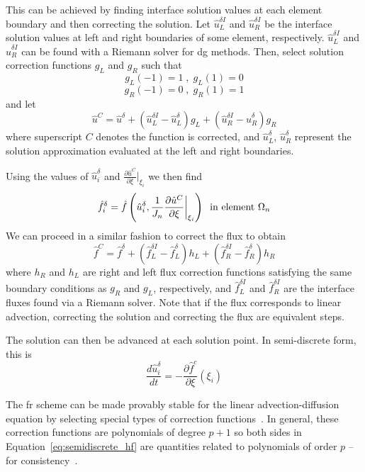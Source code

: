 This can be achieved by finding interface solution values at each element boundary and then correcting the 
solution. Let $\hat{u}_L^{\delta I}$ and $\hat{u}_R^{\delta I}$ be the interface solution values at left and right 
boundaries of some element, respectively. $\hat{u}_L^{\delta I}$ and $\hat{u}_R^{\delta I}$ can be found with a Riemann solver for \gls{dg} methods\cite{hesthaven2007nodal}. Then, select solution correction functions $g_L$ and 
$g_R$ such 
that
\begin{equation}\label{eq:condition_hf}
g_L(-1) = 1 \;,\; g_L(1) = 0
\end{equation}
\begin{equation}
g_R(-1) = 0 \;,\; g_R(1) = 1
\end{equation}
and let
\begin{equation}
\hat{u}^C = \hat{u}^\delta + (\hat{u}^{\delta I}_L - \hat{u}^\delta_L) g_L + (\hat{u}^{\delta I}_R 
- \hat{u}^\delta_R) g_R
\end{equation}
where superscript $C$ denotes the function is corrected, and $\hat{u}^\delta_L$, $\hat{u}^\delta_R$ 
represent the solution approximation evaluated at the left and right boundaries.

Using the values of $\hat{u}^\delta_i$ and $\frac{\partial \hat{u}^C}{\partial \xi}|_{\xi_i}$ we then find 
$$\hat{f}_i^\delta = \hat{f}\left(\hat{u}^\delta_i,\frac{1}{J_n}\frac{\partial \hat{u}^C}{\partial \xi}\bigg|_{\xi_i}\right) \;\; \text{in element } \Omega_n$$
We can proceed in a similar fashion to correct the flux to obtain
\begin{equation}
\hat{f}^C = \hat{f}^\delta + (\hat{f}^{\delta I}_L - \hat{f}^\delta_L) h_L + (\hat{f}^{\delta I}_R 
- \hat{f}^\delta_R) h_R
\end{equation}
where $h_R$ and $h_L$ are right and left flux correction functions satisfying the same boundary 
conditions as $g_R$ and $g_L$, respectively, and $\hat{f}_L^{\delta I}$ and $\hat{f}_R^{\delta I}$ are the interface fluxes found via a Riemann solver. Note that if the flux corresponds to linear advection, correcting the solution and correcting the flux are equivalent steps.

The solution can then be advanced at each solution point. In semi-discrete form, this is
\begin{equation}\label{eq:semidiscrete_hf}
\frac{d \hat{u}_i^\delta}{d t} = - \frac{\partial \hat{f}^c}{\partial \xi}(\xi_i)
\end{equation}

The \gls{fr} scheme can be made provably stable for the linear advection-diffusion equation by selecting special types of correction functions~\cite{castonguay2013energy}. In general, these correction functions are polynomials of degree $p+1$ so both sides in Equation~\eqref{eq:semidiscrete_hf} are quantities related to polynomials of order $p$ --for consistency~\cite{huynh2007flux}.

